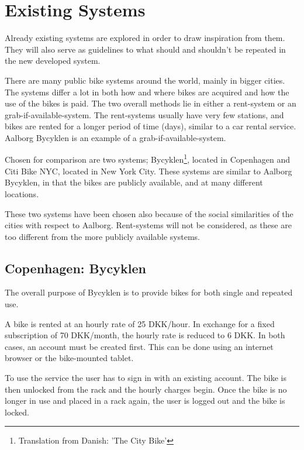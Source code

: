 \section{Existing Systems}

Already existing systems are explored in order to draw inspiration from them.
They will also serve as guidelines to what should and shouldn't be repeated in the new developed system.

There are many public bike systems around the world, mainly in bigger cities.
The systems differ a lot in both how and where bikes are acquired and how the use of the bikes is paid.
The two overall methods lie in either a rent-system or an grab-if-available-system.
The rent-systems usually have very few stations, and bikes are rented for a longer period of time (days), similar to a car rental service.
Aalborg Bycyklen is an example of a grab-if-available-system.

Chosen for comparison are two systems; Bycyklen\footnote{Translation from Danish: 'The City Bike'}, located in Copenhagen and Citi Bike NYC, located in New York City.
These systems are similar to Aalborg Bycyklen, in that the bikes are publicly available, and at many different locations.

These two systems have been chosen also because of the social similarities of the cities with respect to Aalborg.
Rent-systems will not be considered, as these are too different from the more publicly available systems.

\subsection{Copenhagen: Bycyklen}
The overall purpose of Bycyklen\cite{cph_bycyklen}\cite{cph_bycyklen_conditions} is to provide bikes for both single and repeated use.

A bike is rented at an hourly rate of 25 DKK/hour.
In exchange for a fixed subscription of 70 DKK/month, the hourly rate is reduced to 6 DKK.
In both cases, an account must be created first.
This can be done using an internet browser or the bike-mounted tablet.

To use the service the user has to sign in with an existing account.
The bike is then unlocked from the rack and the hourly charges begin.
Once the bike is no longer in use and placed in a rack again, the user is logged out and the bike is locked.

